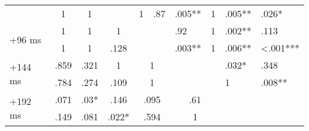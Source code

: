 \documentclass[sigconf]{acmart}
\begin{document}
\begin{table*}
\begin{tabularx}{16cm}{XXXXXXXXXXXXX}
                         &\multicolumn{2}{c}{\cellcolor{M}1\phantom{<<<<<}}			&\multicolumn{2}{c}{\cellcolor{M}1\phantom{<<<<<}}	 		&				& 			     							&\cellcolor{L}1 & \cellcolor{O}.87    		&\cellcolor{L}\phantom{<}.005** & \cellcolor{O}1		&\cellcolor{L}\phantom{<}.005** & \cellcolor{O}\phantom{<}.026*  	\\
\multirow{2}{*}{+96 ms}  &\multicolumn{2}{c}{\cellcolor{I}1\phantom{<<<<<}}		&\multicolumn{2}{c}{\cellcolor{I}1\phantom{<<<<<}}			&\multicolumn{2}{c}{\cellcolor{I}1\phantom{<<<<<}}							&				& 				    		&\cellcolor{C}\phantom{<}.92 & \cellcolor{A}1  			&\cellcolor{C}\phantom{<}.002** & \cellcolor{A}\phantom{<}.113  		\\
                       	 &\multicolumn{2}{c}{\cellcolor{M}1\phantom{<<<<<}}		&\multicolumn{2}{c}{\cellcolor{M}1\phantom{<<<<<}}		&\multicolumn{2}{c}{\cellcolor{M}\phantom{<}.128\phantom{<}}			&				& 				    		&\cellcolor{L}\phantom{<}.003** & \cellcolor{O}1  			&\cellcolor{L}\phantom{<}.006** & \cellcolor{O}<.001***  	\\
\multirow{2}{*}{+144 ms} &\multicolumn{2}{c}{\cellcolor{I}\phantom{<}.859\phantom{<}}		&\multicolumn{2}{c}{\cellcolor{I}\phantom{<}.321\phantom{<}}		&\multicolumn{2}{c}{\cellcolor{I}1\phantom{<<<<<}}							&\multicolumn{2}{c}{\cellcolor{I}1\phantom{<<<<<}}			&				& 								&\cellcolor{C}\phantom{<}.032* & \cellcolor{A}\phantom{<}.348  		\\
                         &\multicolumn{2}{c}{\cellcolor{M}\phantom{<}.784\phantom{<}}		&\multicolumn{2}{c}{\cellcolor{M}\phantom{<}.274\phantom{<}}		&\multicolumn{2}{c}{\cellcolor{M}\phantom{<}.109\phantom{<}}   			&\multicolumn{2}{c}{\cellcolor{M}1\phantom{<<<<<} }      	&				&								&\cellcolor{L}1 & \cellcolor{O}\phantom{<}.008**  			\\ 
\multirow{2}{*}{+192 ms} &\multicolumn{2}{c}{\cellcolor{I}\phantom{<}.071\phantom{<}}		&\multicolumn{2}{c}{\cellcolor{I}\phantom{<}.03*\phantom{<}}		&\multicolumn{2}{c}{\cellcolor{I}\phantom{<<}.146\phantom{<}}			&\multicolumn{2}{c}{\cellcolor{I}\phantom{<}.095\phantom{<}}		&\multicolumn{2}{c}{\cellcolor{I}\phantom{<}.61}				&				&	  							\\
                         &\multicolumn{2}{c}{\cellcolor{M}\phantom{<}.149\phantom{<}}		&\multicolumn{2}{c}{\cellcolor{M}\phantom{<}.081\phantom{<}}		&\multicolumn{2}{c}{\cellcolor{M}\phantom{<}.022*}   			&\multicolumn{2}{c}{\cellcolor{M}\phantom{<}.594\phantom{<}}   	&\multicolumn{2}{c}{\cellcolor{M}1}  			&				&  								\\\hline
\end{tabularx}	
\label{table:q_p}	
\end{table*}
\end{document}
